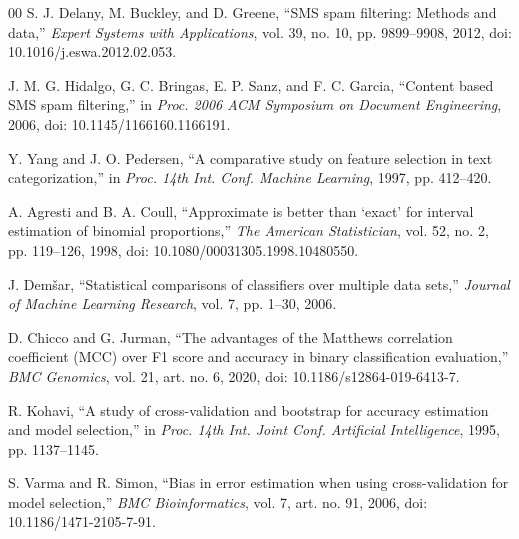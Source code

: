 \documentclass[conference]{IEEEtran}
\begin{document}
\begin{thebibliography}{00}
S. J. Delany, M. Buckley, and D. Greene, ``SMS spam filtering: Methods and data,'' \emph{Expert Systems with Applications}, vol. 39, no. 10, pp. 9899--9908, 2012, doi: 10.1016/j.eswa.2012.02.053.

J. M. G. Hidalgo, G. C. Bringas, E. P. Sanz, and F. C. Garcia, ``Content based SMS spam filtering,'' in \emph{Proc. 2006 ACM Symposium on Document Engineering}, 2006, doi: 10.1145/1166160.1166191.

Y. Yang and J. O. Pedersen, ``A comparative study on feature selection in text categorization,'' in \emph{Proc. 14th Int. Conf. Machine Learning}, 1997, pp. 412--420.

A. Agresti and B. A. Coull, ``Approximate is better than `exact' for interval estimation of binomial proportions,'' \emph{The American Statistician}, vol. 52, no. 2, pp. 119--126, 1998, doi: 10.1080/00031305.1998.10480550.

J. Dem\v{s}ar, ``Statistical comparisons of classifiers over multiple data sets,'' \emph{Journal of Machine Learning Research}, vol. 7, pp. 1--30, 2006.


D. Chicco and G. Jurman, ``The advantages of the Matthews correlation coefficient (MCC) over F1 score and accuracy in binary classification evaluation,'' \emph{BMC Genomics}, vol. 21, art. no. 6, 2020, doi: 10.1186/s12864-019-6413-7.

R. Kohavi, ``A study of cross-validation and bootstrap for accuracy estimation and model selection,'' in \emph{Proc. 14th Int. Joint Conf. Artificial Intelligence}, 1995, pp. 1137--1145.

S. Varma and R. Simon, ``Bias in error estimation when using cross-validation for model selection,'' \emph{BMC Bioinformatics}, vol. 7, art. no. 91, 2006, doi: 10.1186/1471-2105-7-91.

\end{thebibliography}
\end{document}
